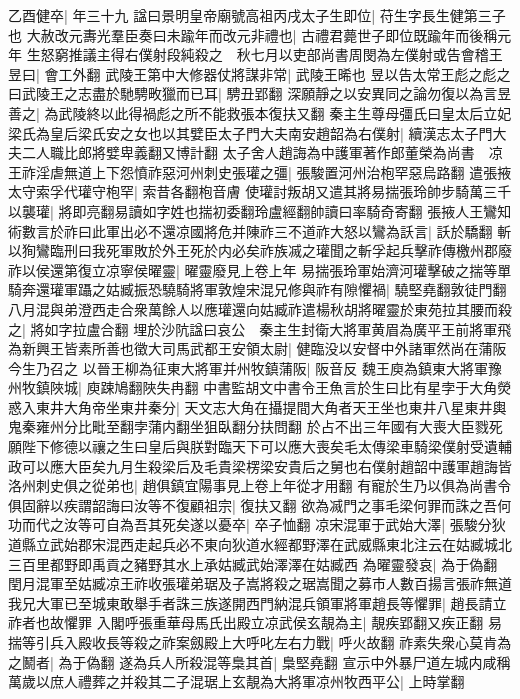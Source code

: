 乙酉健卒|{
	年三十九}
諡曰景明皇帝廟號高祖丙戌太子生即位|{
	苻生字長生健第三子也}
大赦改元夀光羣臣奏曰未踰年而改元非禮也|{
	古禮君薨世子即位既踰年而後稱元年}
生怒窮推議主得右僕射段純殺之　秋七月以吏部尚書周閔為左僕射或告會稽王昱曰|{
	會工外翻}
武陵王第中大修器仗將謀非常|{
	武陵王晞也}
昱以告太常王彪之彪之曰武陵王之志盡於馳騁畋獵而已耳|{
	騁丑郢翻}
深願靜之以安異同之論勿復以為言昱善之|{
	為武陵終以此得禍彪之所不能救張本復扶又翻}
秦主生尊母彊氏曰皇太后立妃梁氏為皇后梁氏安之女也以其嬖臣太子門大夫南安趙韶為右僕射|{
	續漢志太子門大夫二人職比郎將嬖卑義翻又博計翻}
太子舍人趙誨為中護軍著作郎董榮為尚書　凉王祚淫虐無道上下怨憤祚惡河州刺史張瓘之彊|{
	張駿置河州治枹罕惡烏路翻}
遣張掖太守索孚代瓘守枹罕|{
	索昔各翻枹音膚}
使瓘討叛胡又遣其將易揣張玲帥步騎萬三千以襲瓘|{
	將即亮翻易讀如字姓也揣初委翻玲盧經翻帥讀曰率騎奇寄翻}
張掖人王鸞知術數言於祚曰此軍出必不還凉國將危并陳祚三不道祚大怒以鸞為訞言|{
	訞於驕翻}
斬以狥鸞臨刑曰我死軍敗於外王死於内必矣祚族㓕之瓘聞之斬孚起兵擊祚傳檄州郡廢祚以侯還第復立凉寧侯曜靈|{
	曜靈廢見上卷上年}
易揣張玲軍始濟河瓘擊破之揣等單騎奔還瓘軍躡之姑臧振恐驍騎將軍敦煌宋混兄修與祚有隙懼禍|{
	驍堅堯翻敦徒門翻}
八月混與弟澄西走合衆萬餘人以應瓘還向姑臧祚遣楊秋胡將曜靈於東苑拉其腰而殺之|{
	將如字拉盧合翻}
埋於沙阬諡曰哀公　秦主生封衛大將軍黄眉為廣平王前將軍飛為新興王皆素所善也徵大司馬武都王安領太尉|{
	健臨没以安督中外諸軍然尚在蒲阪今生乃召之}
以晉王柳為征東大將軍并州牧鎮蒲阪|{
	阪音反}
魏王庾為鎮東大將軍豫州牧鎮陜城|{
	庾踈鳩翻陜失冉翻}
中書監胡文中書令王魚言於生曰比有星孛于大角熒惑入東井大角帝坐東井秦分|{
	天文志大角在攝提間大角者天王坐也東井八星東井輿鬼秦雍州分比毗至翻孛蒲内翻坐狙臥翻分扶問翻}
於占不出三年國有大喪大臣戮死願陛下修德以禳之生曰皇后與朕對臨天下可以應大喪矣毛太傳梁車騎梁僕射受遺輔政可以應大臣矣九月生殺梁后及毛貴梁楞梁安貴后之舅也右僕射趙韶中護軍趙誨皆洛州刺史俱之從弟也|{
	趙俱鎮宜陽事見上卷上年從才用翻}
有寵於生乃以俱為尚書令俱固辭以疾謂韶誨曰汝等不復顧祖宗|{
	復扶又翻}
欲為㓕門之事毛梁何罪而誅之吾何功而代之汝等可自為吾其死矣遂以憂卒|{
	卒子恤翻}
凉宋混軍于武始大澤|{
	張駿分狄道縣立武始郡宋混西走起兵必不東向狄道水經都野澤在武威縣東北注云在姑臧城北三百里都野即禹貢之豬野其水上承姑臧武始澤澤在姑臧西}
為曜靈發哀|{
	為于偽翻}
閏月混軍至姑臧凉王祚收張瓘弟琚及子嵩將殺之琚嵩聞之募市人數百揚言張祚無道我兄大軍已至城東敢舉手者誅三族遂開西門納混兵領軍將軍趙長等懼罪|{
	趙長請立祚者也故懼罪}
入閣呼張重華母馬氏出殿立凉武侯玄靚為主|{
	靚疾郢翻又疾正翻}
易揣等引兵入殿收長等殺之祚案劔殿上大呼叱左右力戰|{
	呼火故翻}
祚素失衆心莫肯為之鬭者|{
	為于偽翻}
遂為兵人所殺混等梟其首|{
	梟堅堯翻}
宣示中外暴尸道左城内咸稱萬歲以庶人禮葬之并殺其二子混琚上玄靚為大將軍凉州牧西平公|{
	上時掌翻}
